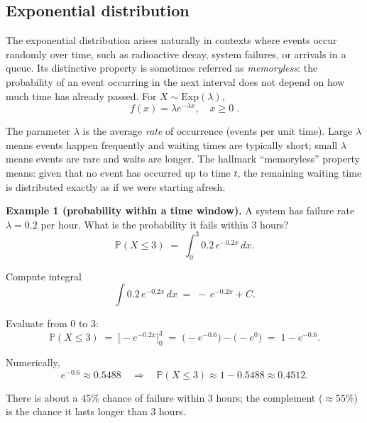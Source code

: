 \documentclass{book}
\begin{document}
\subsection*{Exponential distribution}

The exponential distribution arises naturally in contexts where events occur randomly over time, such as radioactive decay, system failures, or arrivals in a queue. Its distinctive property is sometimes referred as \emph{memoryless}: the probability of an event occurring in the next interval does not depend on how much time has already passed. For $X \sim \text{Exp}(\lambda)$,
\begin{equation}
	f(x) = \lambda e^{-\lambda x}, \quad x \geq 0 \; .
	\label{eq:exponential}
\end{equation}

The parameter $\lambda$ is the average \emph{rate} of occurrence (events per unit time). Large $\lambda$ means events happen frequently and waiting times are typically short; small $\lambda$ means events are rare and waits are longer. The hallmark “memoryless” property means: given that no event has occurred up to time $t$, the remaining waiting time is distributed exactly as if we were starting afresh.

\medskip

\textbf{Example 1 (probability within a time window).} A system has failure rate $\lambda=0.2$ per hour. What is the probability it fails within 3 hours?
\begin{equation}
	\mathbb{P}(X \le 3) \;=\; \int_{0}^{3} 0.2\, e^{-0.2x} \, dx.
\end{equation}

Compute integral
\begin{equation}
	\int 0.2\, e^{-0.2x} \, dx \;=\; -\, e^{-0.2x} + C.
\end{equation}

Evaluate from $0$ to $3$:
\begin{equation}
	\mathbb{P}(X \le 3) \;=\; \big[-e^{-0.2x}\big]_{0}^{3} \;=\; \big(-e^{-0.6}\big) - \big(-e^{0}\big) \;=\; 1 - e^{-0.6}.
\end{equation}

Numerically,
\begin{equation}
	e^{-0.6} \approx 0.5488 
	\quad \Rightarrow \quad 
	\mathbb{P}(X \le 3) \approx 1 - 0.5488 \approx 0.4512.
\end{equation}

There is about a $45\%$ chance of failure within 3 hours; the complement ($\approx 55\%$) is the chance it lasts longer than 3 hours.
\end{document}
